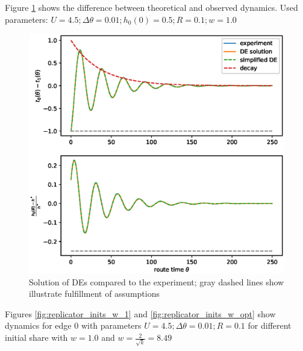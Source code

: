 \documentclass[12pt]{article}
\begin{document}
Figure \ref{fig:de_comparison} shows the difference between theoretical and observed dynamics. Used parameters: $ U = 4.5; \Delta\theta = 0.01;  h_0(0) = 0.5;  R = 0.1; w = 1.0 $

\begin{figure}
	\includegraphics[scale=0.75]{img/de_comparison.eps}
	\caption{Solution of DEs compared to the experiment; gray dashed lines show illustrate fulfillment of assumptions }
	\label{fig:de_comparison}

\end{figure}	

Figures \ref{fig:replicator_inits_w_1} and \ref{fig:replicator_inits_w_opt} show dynamics for edge 0 with parameters $U = 4.5; \Delta\theta = 0.01; R = 0.1$ for different initial share with $ w = 1.0 $ and $w = \frac{2}{\sqrt{k}} = 8.49$
\end{document}

